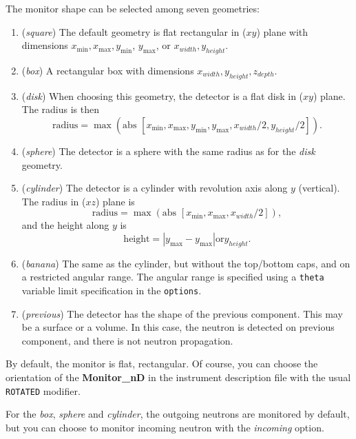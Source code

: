 The monitor shape can be selected among seven geometries:
\begin{enumerate}
\item{(\textit{square}) The default geometry is flat rectangular in ($xy$)
    plane with dimensions $x_\mathrm{min}, x_\mathrm{max}, y_\mathrm{min}$,
    $y_\mathrm{max}$, or $x_{width}, y_{height}$.}
\item{(\textit{box}) A rectangular box with dimensions $x_{width}, y_{height}, z_{depth}$.}
\item{(\textit{disk}) When choosing this geometry, the detector is a flat
    disk in ($xy$) plane. The radius is then
    \begin{equation}
      \mbox{radius} = \max ( \mbox{abs } [ x_\mathrm{min}, x_\mathrm{max}, y_\mathrm{
        min}, y_\mathrm{max}, x_{width}/2, y_{height}/2 ] ).
    \end{equation}
    }
\item{(\textit{sphere}) The detector is a sphere with the same radius as
    for the \textit{disk} geometry.}
\item{(\textit{cylinder}) The detector is a cylinder with revolution axis
    along $y$ (vertical). The radius in ($xz$) plane is
    \begin{equation}
      \mbox{radius} =  \max ( \mbox{abs } [ x_\mathrm{min}, x_\mathrm{max}, x_{width}/2 ] ),
    \end{equation}
    and the height along $y$ is
    \begin{equation}
      \mbox{height} =  | y_\mathrm{max} - y_\mathrm{max} | \mathrm{or} y_{height}.
    \end{equation}
    }
\item{(\textit{banana}) The same as the cylinder, but without the top/bottom caps, and on a restricted angular range. The angular range is specified using a \verb+theta+ variable limit specification in the \verb+options+.}
\item{(\textit{previous}) The detector has the shape of the previous component. This may be a surface or a volume. In this case, the neutron is detected on previous component, and there is not neutron propagation.}
\end{enumerate}

By default, the monitor is flat, rectangular. Of course, you can choose
the orientation of the \textbf{Monitor\_nD} in the instrument description
file with the usual \texttt{ROTATED} modifier.

For the \textit{box}, \textit{sphere} and \textit{cylinder}, the outgoing neutrons are
monitored by default, but you can choose to monitor incoming neutron
with the \textit{incoming} option.

